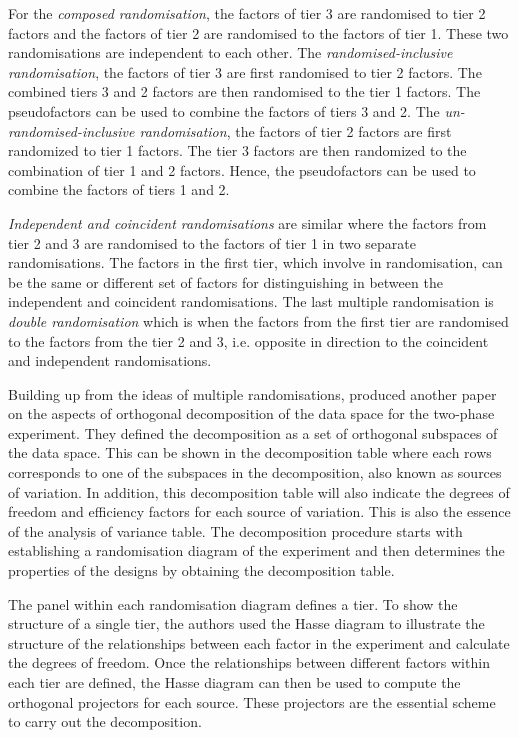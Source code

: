 \documentclass[11pt,a4paper]{article}
\begin{document}
For the \emph{composed randomisation}, the factors of tier 3 are randomised to tier 2 factors and the factors of tier 2 are randomised to the factors of tier 1. These two randomisations are independent to each other. The \emph{randomised-inclusive randomisation}, the factors of tier 3 are first randomised to tier 2 factors. The combined tiers 3 and 2 factors are then randomised to the tier 1 factors. The pseudofactors can be used to combine the factors of tiers 3 and 2. The \emph{un-randomised-inclusive randomisation}, the factors of tier 2 factors are first randomized to tier 1 factors. The tier 3 factors are then randomized to the combination of tier 1 and 2 factors. Hence, the pseudofactors can be used to combine the factors of tiers 1 and 2. 

\emph{Independent and coincident randomisations} are similar where the factors from tier 2 and 3 are randomised to the factors of tier 1 in two separate randomisations. The factors in the first tier, which involve in randomisation, can be the same or different set of factors for distinguishing in between the independent and coincident randomisations. The last multiple randomisation is \emph{double randomisation} which is when the factors from the first tier are randomised to the factors from the tier 2 and 3, i.e. opposite in direction to the coincident and independent randomisations. 

Building up from the ideas of multiple randomisations, \cite{Brien2009, Brien2010} produced another paper on the aspects of orthogonal decomposition of the data space for the two-phase experiment. They defined the decomposition as a set of orthogonal subspaces of the data space. This can be shown in the decomposition table where each rows corresponds to one of the subspaces in the decomposition, also known as sources of variation. In addition, this decomposition table will also indicate the degrees of freedom and efficiency factors for each source of variation. This is also the essence of the analysis of variance table. The decomposition procedure starts with establishing a randomisation diagram of the experiment and then determines the properties of the designs by obtaining the decomposition table.
 
The panel within each randomisation diagram defines a tier. To show the structure of a single tier, the authors used the Hasse diagram to illustrate the structure of the relationships between each factor in the experiment and calculate the degrees of freedom. Once the relationships between different factors within each tier are defined, the Hasse diagram can then be used to compute the orthogonal projectors for each source. These projectors are the essential scheme to carry out the decomposition.
 
\end{document}
